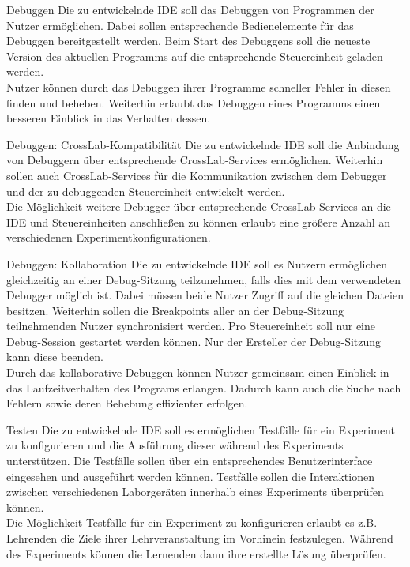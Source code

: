 \begin{requirement}{Debuggen}
  \reqdescription Die zu entwickelnde IDE soll das Debuggen von Programmen der Nutzer ermöglichen. Dabei sollen entsprechende Bedienelemente für das Debuggen bereitgestellt werden. Beim Start des Debuggens soll die neueste Version des aktuellen Programms auf die entsprechende Steuereinheit geladen werden. \\
  \reqrationale Nutzer können durch das Debuggen ihrer Programme schneller Fehler in diesen finden und beheben. Weiterhin erlaubt das Debuggen eines Programms einen besseren Einblick in das Verhalten dessen. \\
\end{requirement}

\begin{requirement}{Debuggen: CrossLab-Kompatibilität}
  \reqdescription Die zu entwickelnde IDE soll die Anbindung von Debuggern über entsprechende CrossLab-Services ermöglichen. Weiterhin sollen auch CrossLab-Services für die Kommunikation zwischen dem Debugger und der zu debuggenden Steuereinheit entwickelt werden. \\
  \reqrationale Die Möglichkeit weitere Debugger über entsprechende CrossLab-Services an die IDE und Steuereinheiten anschließen zu können erlaubt eine größere Anzahl an verschiedenen Experimentkonfigurationen. \\
\end{requirement}

\begin{requirement}{Debuggen: Kollaboration}
  \reqdescription Die zu entwickelnde IDE soll es Nutzern ermöglichen gleichzeitig an einer Debug-Sitzung teilzunehmen, falls dies mit dem verwendeten Debugger möglich ist. Dabei müssen beide Nutzer Zugriff auf die gleichen Dateien besitzen. Weiterhin sollen die Breakpoints aller an der Debug-Sitzung teilnehmenden Nutzer synchronisiert werden. Pro Steuereinheit soll nur eine Debug-Session gestartet werden können. Nur der Ersteller der Debug-Sitzung kann diese beenden. \\
  \reqrationale Durch das kollaborative Debuggen können Nutzer gemeinsam einen Einblick in das Laufzeitverhalten des Programs erlangen. Dadurch kann auch die Suche nach Fehlern sowie deren Behebung effizienter erfolgen. \\
\end{requirement}

\begin{requirement}{Testen}
  \reqdescription Die zu entwickelnde IDE soll es ermöglichen Testfälle für ein Experiment zu konfigurieren und die Ausführung dieser während des Experiments unterstützen. Die Testfälle sollen über ein entsprechendes Benutzerinterface eingesehen und ausgeführt werden können. Testfälle sollen die Interaktionen zwischen verschiedenen Laborgeräten innerhalb eines Experiments überprüfen können. \\
  \reqrationale Die Möglichkeit Testfälle für ein Experiment zu konfigurieren erlaubt es z.B. Lehrenden die Ziele ihrer Lehrveranstaltung im Vorhinein festzulegen. Während des Experiments können die Lernenden dann ihre erstellte Lösung überprüfen. \\
\end{requirement}

